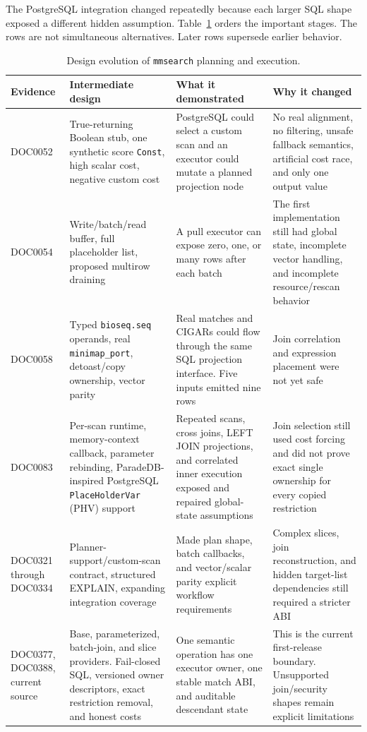 The PostgreSQL integration changed repeatedly because each larger SQL shape
exposed a different hidden assumption.  Table~\ref{tab:customscan-evolution}
orders the important stages.  The rows are not simultaneous alternatives.
Later rows supersede earlier behavior.

\begin{table}[htbp]
\centering
\scriptsize
\caption{Design evolution of \texttt{mmsearch} planning and execution.}
\label{tab:customscan-evolution}
\begin{tabular}{@{}p{}p{}p{}p{}@{}}
\toprule
Evidence & Intermediate design & What it demonstrated & Why it changed \\
\midrule
DOC0052 &
True-returning Boolean stub, one synthetic score \texttt{Const}, high scalar
cost, negative custom cost &
PostgreSQL could select a custom scan and an executor could mutate a planned
projection node &
No real alignment, no filtering, unsafe fallback semantics, artificial cost
race, and only one output value \\
DOC0054 &
Write/batch/read buffer, full placeholder list, proposed multirow draining &
A pull executor can expose zero, one, or many rows after each batch &
The first implementation still had global state, incomplete vector handling,
and incomplete resource/rescan behavior \\
DOC0058 &
Typed \texttt{bioseq.seq} operands, real \texttt{minimap\_port}, detoast/copy
ownership, vector parity &
Real matches and CIGARs could flow through the same SQL projection interface.
Five inputs emitted nine rows &
Join correlation and expression placement were not yet safe \\
DOC0083 &
Per-scan runtime, memory-context callback, parameter rebinding,
ParadeDB-inspired PostgreSQL \texttt{PlaceHolderVar} (PHV) support &
Repeated scans, cross joins, LEFT JOIN projections, and correlated inner
execution exposed and repaired global-state assumptions &
Join selection still used cost forcing and did not prove exact single
ownership for every copied restriction \\
DOC0321 through DOC0334 &
Planner-support/custom-scan contract, structured EXPLAIN, expanding
integration coverage &
Made plan shape, batch callbacks, and vector/scalar parity explicit workflow
requirements &
Complex slices, join reconstruction, and hidden target-list dependencies
still required a stricter ABI \\
DOC0377, DOC0388, current source &
Base, parameterized, batch-join, and slice providers.  Fail-closed SQL,
versioned owner descriptors, exact restriction removal, and honest costs &
One semantic operation has one executor owner, one stable match ABI, and
auditable descendant state &
This is the current first-release boundary.  Unsupported join/security shapes
remain explicit limitations \\
\bottomrule
\end{tabular}
\end{table}

